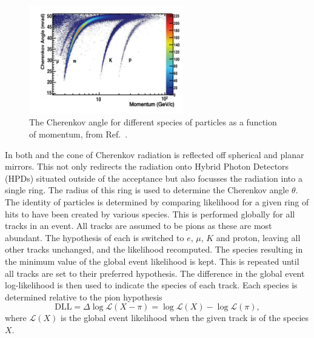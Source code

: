 \begin{figure}[!h]
    \centering
    \includegraphics[width=0.6\textwidth]{figs/Detector/rich_speices.pdf}
    \caption{The Cherenkov angle for different species of particles as a function of momentum, from Ref.~\cite{LHCb-DP-2012-003}.}
    \label{fig:Dec_rich_species}   
\end{figure}


In both \richone and \richtwo the cone of Cherenkov radiation is reflected off spherical and planar mirrors. This not only redirects the radiation onto Hybrid Photon Detectors (HPDs) situated outside of the acceptance but also focusses the radiation into a single ring.    
The radius of this ring is used to determine the Cherenkov angle $\theta$. 
The identity of particles is determined by comparing likelihood for a given ring of hits to have been created by various species. 
This is performed globally for all tracks in an event. All tracks are assumed to be pions as these are most abundant. The hypothesis of each is switched to $e$, $\mu$, $K$ and proton, leaving all other tracks unchanged, and the likelihood recomputed. The species resulting in the minimum value of the global event likelihood is kept. This is repeated until all tracks are set to their preferred hypothesis. 
The difference in the global event log-likelihood is then used to indicate the species of each track. Each species is determined relative to the pion hypothesis 
\begin{equation}
\text{DLL} = \Delta \log{\mathcal{L}(X-\pi)} = \log{\mathcal{L}(X)} - \log{\mathcal{L}(\pi)},
\end{equation}
where $\mathcal{L}(X)$ is the global event likelihood when the given track is of the species $X$.








